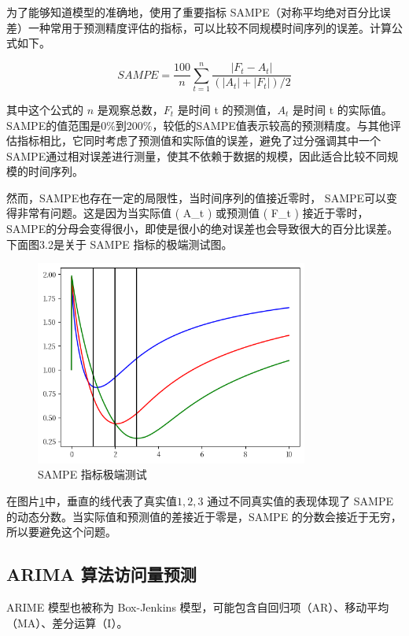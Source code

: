 为了能够知道模型的准确地，使用了重要指标 SAMPE（对称平均绝对百分比误差）一种常用于预测精度评估的指标，可以比较不同规模时间序列的误差。计算公式如下。

\begin{equation}
	SAMPE={\frac{100}{n}}\sum_{t=1}^{n}{\frac{|F_{t}-A_{t}|}{(|A_{t}|+|F_{t}|)/2}}
\end{equation}

其中这个公式的 $n$ 是观察总数，$F_t$ 是时间 t 的预测值，$A_t$ 是时间 t 的实际值。
SAMPE的值范围是0\%到200\%，较低的SAMPE值表示较高的预测精度。与其他评估指标相比，它同时考虑了预测值和实际值的误差，避免了过分强调其中一个
SAMPE通过相对误差进行测量，使其不依赖于数据的规模，因此适合比较不同规模的时间序列。

然而，SAMPE也存在一定的局限性，当时间序列的值接近零时，
SAMPE可以变得非常有问题。这是因为当实际值 ( A\_t ) 或预测值 ( F\_t ) 接近于零时，SAMPE的分母会变得很小，即使是很小的绝对误差也会导致很大的百分比误差。下面图3.2是关于 SAMPE 指标的极端测试图。

\begin{figure}
	\centering
	\includegraphics[width=0.8\textwidth]{figures/sampe_external.png}
	\caption{SAMPE 指标极端测试}
	\label{sampe-property}
\end{figure}

在图片\ref{sampe-property}中，垂直的线代表了真实值$1 , 2, 3$ 通过不同真实值的表现体现了 SAMPE 的动态分数。当实际值和预测值的差接近于零是，SAMPE 的分数会接近于无穷，所以要避免这个问题。

\subsection{ARIMA 算法访问量预测}

ARIME 模型也被称为 Box-Jenkins 模型，可能包含自回归项（AR）、移动平均（MA）、差分运算（I）。

